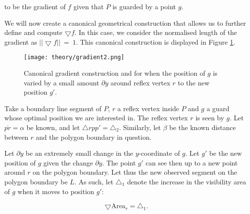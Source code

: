 to be the gradient of $f$ given that $P$ is guarded by a point $g$. 

We will now create a canonical geometrical construction that allows us to further define and compute $\bigtriangledown f$. In this case, we consider the normalised length of the gradient as $||\bigtriangledown f||~=~1$. This canonical construction is displayed in Figure \ref{fig:gradient}. 

\begin{figure}[h!]
    \centering
    \texttt{[image: theory/gradient2.png]}
    \caption{Canonical gradient construction and for when the position of $g$ is varied by a small amount $\partial y$ around reflex vertex $r$ to the new position $g'$.}
    \label{fig:gradient}
\end{figure}

Take a boundary line segment of $P$, $r$ a reflex vertex inside $P$ and $g$ a guard whose optimal position we are interested in. The reflex vertex $r$ is seen by $g$. Let $\overline{pr} = \alpha$ be known, and let $\triangle rpp' = \triangle_2$. Similarly, let $\beta$ be the known distance between $r$ and the polygon boundary in question.



Let $\partial y$ be an extremely small change in the $y$-coordinate of $g$. Let $g'$ be the new position of $g$ given the change $\partial y$. The point $g'$ can see then up to a new point around $r$ on the polygon boundary. Let thus the new observed segment on the polygon boundary be $L$. As such, let $\triangle_1$ denote the increase in the visibility area of $g$ when it moves to position $g'$:

\begin{equation}
    \bigtriangledown \text{Area}_r = \triangle_1. \label{eq:derivative}
\end{equation}





